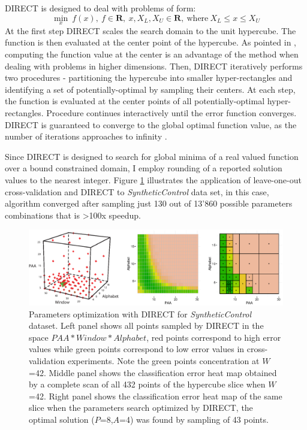 DIRECT is designed to deal with problems of form:
\begin{equation}
 \min_{x} \: f(x), \: f \in \mathbf{R}, \: x, X_{L}, X_{U} \in \mathbf{R}, \: \text{where} \: X_{L} \leq x \leq X_{U}
 \label{formula:direct}
\end{equation} 
At the first step DIRECT scales the search domain to the unit hypercube. The function is then evaluated 
at the center point of the hypercube. As pointed in \cite{citeulike:12563460}, computing the function value
at the center is an advantage of the method when dealing with problems
in higher dimensions.
Then, DIRECT iteratively performs two procedures - partitioning the hypercube into smaller hyper-rectangles 
and identifying a set of potentially-optimal by sampling their centers. At each step, the function is evaluated 
at the center points of all potentially-optimal hyper-rectangles. Procedure continues interactively until the 
error function converges. DIRECT is guaranteed to converge to the global optimal function value,
as the number of iterations approaches to infinity \cite{citeulike:12563460}.

Since DIRECT is designed to search for global minima of a real valued function over 
a bound constrained domain, I employ rounding of a reported solution values to the nearest integer.
Figure \ref{fig:direct-sampling} illustrates the application of leave-one-out cross-validation and DIRECT to 
\textit{SyntheticControl} data set, in this case, algorithm converged after sampling just 130 out of 13'860 
possible parameters combinations that is \textgreater100x speedup.

\begin{figure}[t]
   \centering
   \includegraphics[width=150mm]{figures/figure_direct.eps}
   \caption{Parameters optimization with DIRECT for \textit{SyntheticControl} dataset. 
   Left panel shows all points sampled by DIRECT in the space \mbox{$PAA*Window*Alphabet$},
   red points correspond to high error values while green points correspond to low error values 
   in cross-validation experiments. 
   Note the green points concentration at $W$=42. 
   Middle panel shows the classification error heat map obtained by a complete scan 
   of all 432 points of the hypercube slice when $W$=42. 
   Right panel shows the classification error heat map of the same slice when 
   the parameters search optimized by DIRECT, 
   the optimal solution ($P$=8,$A$=4) was found by sampling of 43 points.}
   \label{fig:direct-sampling}
\end{figure}



